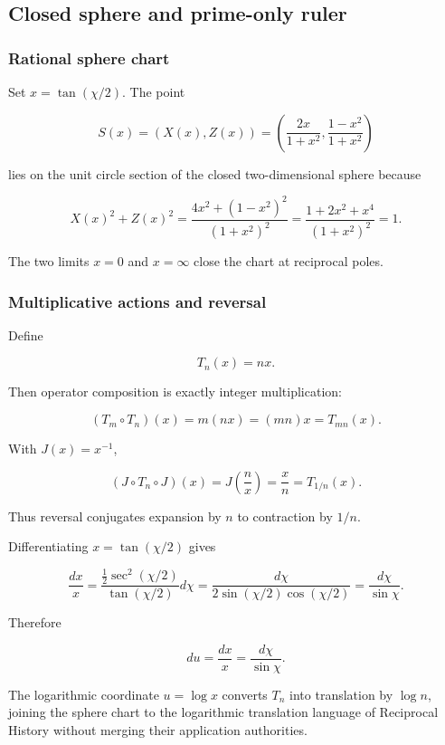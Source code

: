 \subsection{Closed sphere and prime-only
ruler}\label{viii-ch10-closed-sphere-and-prime-only-ruler}

\subsubsection{Rational sphere chart}\label{viii-ch10-rational-sphere-chart}

Set \(x=\tan(\chi/2)\). The point

\[
S(x)=\left(X(x),Z(x)\right)
=\left(\frac{2x}{1+x^2},\frac{1-x^2}{1+x^2}\right)
\]

lies on the unit circle section of the closed two-dimensional sphere
because

\[
X(x)^2+Z(x)^2
=\frac{4x^2+(1-x^2)^2}{(1+x^2)^2}
=\frac{1+2x^2+x^4}{(1+x^2)^2}
=1.
\]

The two limits \(x=0\) and \(x=\infty\) close the chart at reciprocal
poles.

\subsubsection{Multiplicative actions and
reversal}\label{viii-ch10-multiplicative-actions-and-reversal}

Define

\[
T_n(x)=nx.
\]

Then operator composition is exactly integer multiplication:

\[
(T_m\circ T_n)(x)=m(nx)=(mn)x=T_{mn}(x).
\]

With \(J(x)=x^{-1}\),

\[
(J\circ T_n\circ J)(x)
=J\!\left(\frac n x\right)
=\frac x n
=T_{1/n}(x).
\]

Thus reversal conjugates expansion by \(n\) to contraction by \(1/n\).

Differentiating \(x=\tan(\chi/2)\) gives

\[
\frac{dx}{x}
=\frac{\tfrac12\sec^2(\chi/2)}{\tan(\chi/2)}d\chi
=\frac{d\chi}{2\sin(\chi/2)\cos(\chi/2)}
=\frac{d\chi}{\sin\chi}.
\]

Therefore

\[
du=\frac{dx}{x}=\frac{d\chi}{\sin\chi}.
\]

The logarithmic coordinate \(u=\log x\) converts \(T_n\) into
translation by \(\log n\), joining the sphere chart to the logarithmic
translation language of Reciprocal History without merging their
application authorities.

